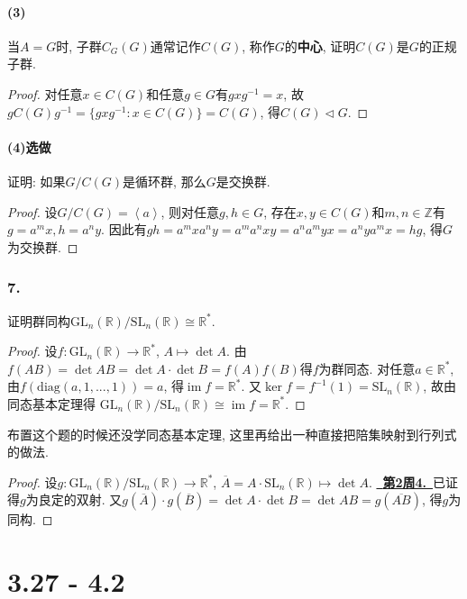 \documentclass[12pt, a4paper, fontset=windows]{ctexart}
\newcommand{\R}{\mathbb{R}}
\newcommand{\Z}{\mathbb{Z}}
\newcommand{\GL}{\mathrm{GL}}
\newcommand{\SL}{\mathrm{SL}}
\newcommand{\cl}[1]{\overline{#1}} %
\newcommand{\gen}[1]{\left\langle{#1}\right\rangle}
\newcommand{\im}{\operatorname{im}}
\newcommand{\isom}{\cong} %
\newcommand{\myref}[2][]{\hyperref[#1]{\color{blue}\ {#2}\ }}
\newcommand{\xuan}{{\normalsize 选做}}
\begin{document}
\subsection*{(3)}

当$A=G$时, 子群$C_G(G)$通常记作$C(G)$, 称作$G$的{\bf 中心}, 
证明$C(G)$是$G$的正规子群. 

\begin{proof}
对任意$x\in C(G)$和任意$g\in G$有$gxg^{-1}=x$, 
故$gC(G)g^{-1}=\{gxg^{-1}:x\in C(G)\}=C(G)$, 
得$C(G)\lhd G$. 
\end{proof}

\subsection*{(4)\xuan}

证明: 如果$G/C(G)$是循环群, 那么$G$是交换群. 

\begin{proof}
设$G/C(G)=\gen{a}$, 则对任意$g,h\in G$, 
存在$x,y\in C(G)$和$m,n\in\Z$有$g=a^mx,h=a^ny$. 
因此有$gh=a^mxa^ny=a^ma^nxy=a^na^myx=a^nya^mx=hg$, 
得$G$为交换群. 
\end{proof}

\section*{7.}

证明群同构$\GL_n(\R)/\SL_n(\R)\isom\R^*$. 

\begin{proof}
设$f:\GL_n(\R)\to\R^*$, $A\mapsto\det A$. 
由$f(AB)=\det AB=\det A\cdot\det B=f(A)f(B)$得$f$为群同态. 
对任意$a\in\R^*$, 由$f(\mathrm{diag}(a,1,...,1))=a$, 得$\im f=\R^*$. 
又$\ker f=f^{-1}(1)=\SL_n(\R)$, 故由同态基本定理得
$\GL_n(\R)/\SL_n(\R)\isom\im f=\R^*$. 
\end{proof}

布置这个题的时候还没学同态基本定理, 这里再给出一种直接把陪集映射到行列式的做法. 

\begin{proof}
设$g:\GL_n(\R)/\SL_n(\R)\to\R^*$, $\cl{A}=A\cdot\SL_n(\R)\mapsto\det A$. 
\myref[GL-SL]{\bf 第2周4.}已证得$g$为良定的双射. 又$g(\cl{A})\cdot g(\cl{B})=
\det A\cdot\det B=\det AB=g(\cl{AB})$, 得$g$为同构. 
\end{proof}

\clearpage
\part{3.27 - 4.2}
\end{document}
